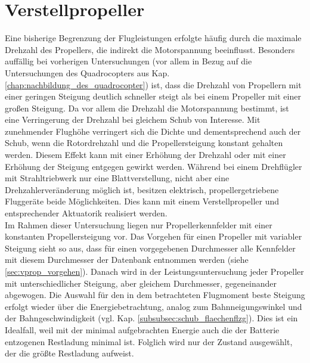 \section{Verstellpropeller}
\label{sec:verstellprop}
Eine bisherige Begrenzung der Flugleistungen erfolgte häufig durch die maximale Drehzahl des Propellers, die indirekt die Motorspannung beeinflusst. 
Besonders auffällig bei vorherigen Untersuchungen (vor allem in Bezug auf die Untersuchungen des Quadrocopters aus Kap. \ref{chap:nachbildung_des_quadrocopter}) ist, dass die Drehzahl von Propellern mit einer geringen Steigung deutlich schneller steigt als bei einem Propeller mit einer großen Steigung. Da vor allem die Drehzahl die Motorspannung bestimmt, ist eine Verringerung der Drehzahl bei gleichem Schub von Interesse. Mit zunehmender Flughöhe verringert sich die Dichte und dementsprechend auch der Schub, wenn die Rotordrehzahl und die Propellersteigung konstant gehalten werden. Diesem Effekt kann mit einer Erhöhung der Drehzahl oder mit einer Erhöhung der Steigung entgegen gewirkt werden. Während bei einem Drehflügler mit Strahltriebwerk nur eine Blattverstellung, nicht aber eine Drehzahlerveränderung möglich ist, besitzen elektrisch, propellergetriebene Fluggeräte beide Möglichkeiten. Dies kann mit einem Verstellpropeller und entsprechender Aktuatorik realisiert werden. \\
Im Rahmen dieser Untersuchung liegen nur Propellerkennfelder mit einer konstanten Propellersteigung vor. Das Vorgehen für einen Propeller mit variabler Steigung sieht so aus, dass für einen vorgegebenen Durchmesser alle Kennfelder mit diesem Durchmesser der Datenbank entnommen werden (siehe \ref{sec:vprop_vorgehen}). Danach wird in der Leistungsuntersuchung jeder Propeller mit unterschiedlicher Steigung, aber gleichem Durchmesser, gegeneinander abgewogen. Die Auswahl für den in dem betrachteten Flugmoment beste Steigung erfolgt wieder über die Energiebetrachtung, analog zum Bahnneigungswinkel und der Bahngeschwindigkeit (vgl. Kap. \ref{subsubsec:schub_flaechenflzg}). Dies ist ein Idealfall, weil mit der minimal aufgebrachten Energie auch die der Batterie entzogenen Restladung minimal ist. Folglich wird nur der Zustand ausgewählt, der die größte Restladung aufweist.

